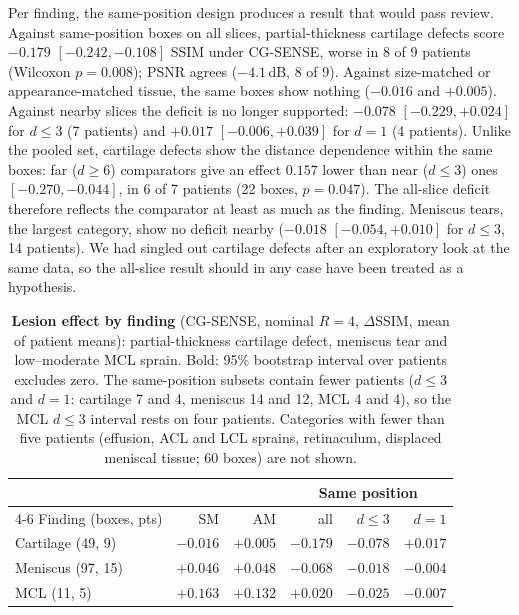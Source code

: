 \documentclass[letterpaper]{article} %
\begin{document}
Per finding, the same-position design produces a result that would pass
review. Against same-position boxes on all slices, partial-thickness
cartilage defects score $-0.179$ $[-0.242, -0.108]$ SSIM under CG-SENSE,
worse in 8 of 9 patients (Wilcoxon $p=0.008$); PSNR agrees ($-4.1$\,dB, 8 of
9). Against size-matched or appearance-matched tissue, the same boxes show
nothing ($-0.016$ and $+0.005$). Against nearby slices the deficit is no
longer supported: $-0.078$ $[-0.229, +0.024]$ for $d\le3$ (7 patients) and
$+0.017$ $[-0.006, +0.039]$ for $d=1$ (4 patients). Unlike the pooled set,
cartilage defects show the distance dependence within the same boxes: far
($d\ge6$) comparators give an effect $0.157$ lower than near ($d\le3$) ones
$[-0.270, -0.044]$, in 6 of 7 patients (22 boxes, $p=0.047$). The all-slice
deficit therefore reflects the comparator at least as much as the finding.
Meniscus tears, the largest category, show no deficit nearby ($-0.018$
$[-0.054, +0.010]$ for $d\le3$, 14 patients). We had singled out cartilage
defects after an exploratory look at the same data, so the all-slice result
should in any case have been treated as a hypothesis.

\begin{table}[t]
\centering
\footnotesize
\setlength{\tabcolsep}{2.4pt}
\begin{tabular}{lrrrrr}
\toprule
& & & \multicolumn{3}{c}{Same position} \\
\cmidrule(lr){4-6}
Finding (boxes, pts) & SM & AM & all & $d\le3$ & $d=1$ \\
\midrule
Cartilage (49, 9) & $-0.016$ & $+0.005$ & $\mathbf{-0.179}$ & $-0.078$ & $+0.017$ \\
Meniscus (97, 15) & $+0.046$ & $+0.048$ & $-0.068$ & $-0.018$ & $-0.004$ \\
MCL (11, 5) & $\mathbf{+0.163}$ & $\mathbf{+0.132}$ & $+0.020$ & $\mathbf{-0.025}$ & $-0.007$ \\
\bottomrule
\end{tabular}
\caption{\textbf{Lesion effect by finding} (CG-SENSE, nominal $R=4$,
$\Delta$SSIM, mean of patient means): partial-thickness cartilage defect,
meniscus tear and low--moderate MCL sprain. Bold: 95\% bootstrap interval
over patients excludes zero. The same-position subsets contain fewer patients
($d\le3$ and $d=1$: cartilage 7 and 4, meniscus 14 and 12, MCL 4 and 4), so
the MCL $d\le3$ interval rests on four patients. Categories with fewer than
five patients (effusion, ACL and LCL sprains, retinaculum, displaced meniscal
tissue; 60 boxes) are not shown.}
\label{tab:labels}
\end{table}
\end{document}
